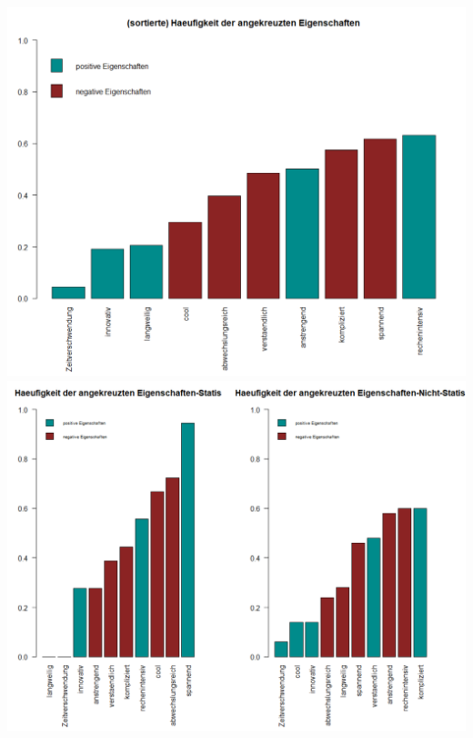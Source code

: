 \documentclass[12pt,a4paper,titlepage=true,parskip,ngerman]{scrartcl}
\begin{document}
\includegraphics[scale=0.5]{sort_pos_neg_Hfgkeit_angekreuzter_Eigenschaften}\\	
\includegraphics[scale=0.5]{(nicht)-statis_sort_pos_neg_Hfgkeit_angekreuzter_Eigenschaften}\\
\vspace{0.5cm}\\
\end{document}

